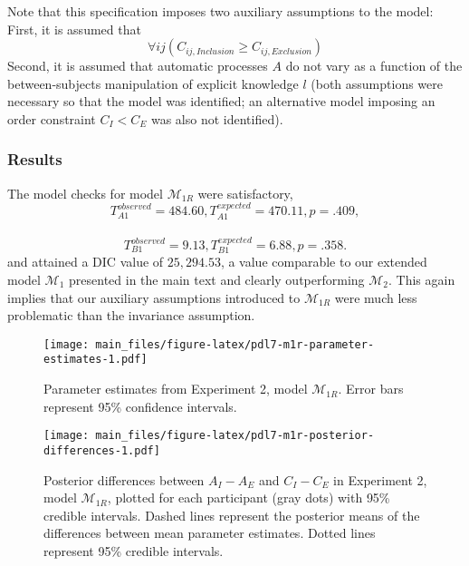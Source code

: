\documentclass[english,,man]{apa6}
\begin{document}
\begin{appendix}
Note that this specification imposes two auxiliary assumptions to the
model: First, it is assumed that
\[\forall{ij}(C_{ij, \textit{Inclusion}} \geq C_{ij, \textit{Exclusion}})\]
Second, it is assumed that automatic processes \(A\) do not vary as a
function of the between-subjects manipulation of explicit knowledge
\(l\) (both assumptions were necessary so that the model was identified;
an alternative model imposing an order constraint \(C_I < C_E\) was also
not identified).

\hypertarget{results-1}{%
\subsubsection{Results}\label{results-1}}

The model checks for model \(\mathcal{M}_{1R}\) were satisfactory,
\[T_{A1}^{observed} = 484.60, T_{A1}^{expected} = 470.11, p = .409,\]~
\[T_{B1}^{observed} = 9.13, T_{B1}^{expected} = 6.88, p = .358.\] and
attained a DIC value of \(25{,}294.53\), a value comparable to our
extended model \(\mathcal{M}_{1}\) presented in the main text and
clearly outperforming \(\mathcal{M}_2\). This again implies that our
auxiliary assumptions introduced to \(\mathcal{M}_{1R}\) were much less
problematic than the invariance assumption.

\begin{figure}
\centering
\texttt{[image: main\_files/figure-latex/pdl7-m1r-parameter-estimates-1.pdf]}
\caption{\label{fig:pdl7-m1r-parameter-estimates}Parameter estimates from
Experiment 2, model \(\mathcal{M}_{1R}\). Error bars represent 95\%
confidence intervals.}
\end{figure}

\begin{figure}
\centering
\texttt{[image: main\_files/figure-latex/pdl7-m1r-posterior-differences-1.pdf]}
\caption{\label{fig:pdl7-m1r-posterior-differences}Posterior differences
between \(A_I - A_E\) and \(C_I - C_E\) in Experiment 2, model
\(\mathcal{M}_{1R}\), plotted for each participant (gray dots) with 95\%
credible intervals. Dashed lines represent the posterior means of the
differences between mean parameter estimates. Dotted lines represent
95\% credible intervals.}
\end{figure}


\end{appendix}
\end{document}

